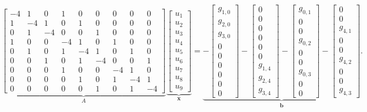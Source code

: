 \begin{equation}\label{eq:laplace-grid-system}
\underbrace{\left[\begin{array}{rrr|rrr|rrr}
-4&1&0&1&0&0&0&0&0\\1&-4&1&0&1&0&0&0&0\\0&1&-4&0&0&1&0&0&0\\\hline
1&0&0&-4&1&0&1&0&0\\0&1&0&1&-4&1&0&1&0\\0&0&1&0&1&-4&0&0&1\\\hline
0&0&0&1&0&0&-4&1&0\\0&0&0&0&1&0&1&-4&1\\0&0&0&0&0&1&0&1&-4
\end{array}\right]}_A
\underbrace{\begin{bmatrix}u_1\\u_2\\u_3\\u_4\\u_5\\u_6\\u_7\\u_8\\u_9\end{bmatrix}}_{\boldsymbol{x}}
=\underbrace{-\begin{bmatrix}g_{1,0}\\g_{2,0}\\g_{3,0}\\0\\0\\0\\0\\0\\0\end{bmatrix}
-\begin{bmatrix}0\\0\\0\\0\\0\\0\\g_{1,4}\\g_{2,4}\\g_{3,4}\end{bmatrix}
-\begin{bmatrix}g_{0,1}\\0\\0\\g_{0,2}\\0\\0\\g_{0,3}\\0\\0\end{bmatrix}
-\begin{bmatrix}0\\0\\g_{4,1}\\0\\0\\g_{4,2}\\0\\0\\g_{4,3}\end{bmatrix}}_{\boldsymbol{b}}.
\end{equation}

